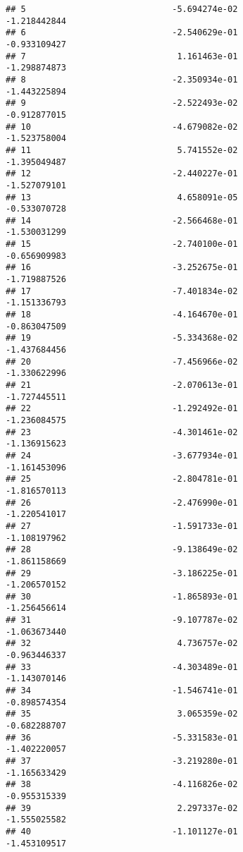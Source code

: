 \documentclass[
]{article}
\begin{document}
\begin{verbatim}
## 5                             -5.694274e-02               -1.218442844
## 6                             -2.540629e-01               -0.933109427
## 7                              1.161463e-01               -1.298874873
## 8                             -2.350934e-01               -1.443225894
## 9                             -2.522493e-02               -0.912877015
## 10                            -4.679082e-02               -1.523758004
## 11                             5.741552e-02               -1.395049487
## 12                            -2.440227e-01               -1.527079101
## 13                             4.658091e-05               -0.533070728
## 14                            -2.566468e-01               -1.530031299
## 15                            -2.740100e-01               -0.656909983
## 16                            -3.252675e-01               -1.719887526
## 17                            -7.401834e-02               -1.151336793
## 18                            -4.164670e-01               -0.863047509
## 19                            -5.334368e-02               -1.437684456
## 20                            -7.456966e-02               -1.330622996
## 21                            -2.070613e-01               -1.727445511
## 22                            -1.292492e-01               -1.236084575
## 23                            -4.301461e-02               -1.136915623
## 24                            -3.677934e-01               -1.161453096
## 25                            -2.804781e-01               -1.816570113
## 26                            -2.476990e-01               -1.220541017
## 27                            -1.591733e-01               -1.108197962
## 28                            -9.138649e-02               -1.861158669
## 29                            -3.186225e-01               -1.206570152
## 30                            -1.865893e-01               -1.256456614
## 31                            -9.107787e-02               -1.063673440
## 32                             4.736757e-02               -0.963446337
## 33                            -4.303489e-01               -1.143070146
## 34                            -1.546741e-01               -0.898574354
## 35                             3.065359e-02               -0.682288707
## 36                            -5.331583e-01               -1.402220057
## 37                            -3.219280e-01               -1.165633429
## 38                            -4.116826e-02               -0.955315339
## 39                             2.297337e-02               -1.555025582
## 40                            -1.101127e-01               -1.453109517

\end{verbatim}
\end{document}
